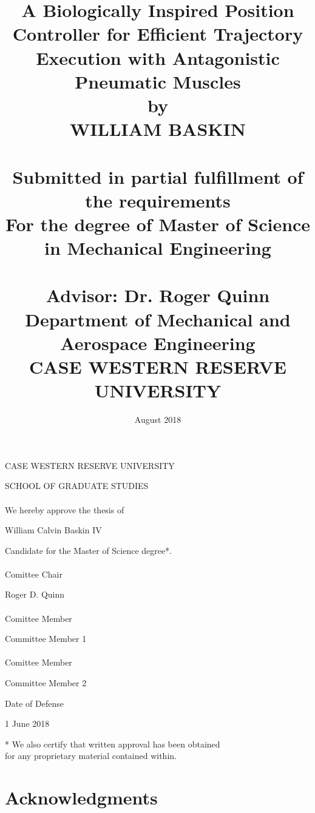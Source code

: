 \documentclass[12pt, letterpaper, oneside, onecolumn]{report} %
\title{
  {A Biologically Inspired Position Controller for Efficient Trajectory Execution with Antagonistic Pneumatic Muscles}\\
  {\large by \\
  WILLIAM BASKIN \\~\\
  Submitted in partial fulfillment of the requirements\\
  For the degree of Master of Science in Mechanical Engineering\\~\\
  Advisor: Dr. Roger Quinn\\
  Department of Mechanical and Aerospace Engineering\\
  CASE WESTERN RESERVE UNIVERSITY}\\
}
\date{August 2018}
\begin{document}
\maketitle

\clearpage
\thispagestyle{empty}

\begin{center}
CASE WESTERN RESERVE UNIVERSITY

SCHOOL OF GRADUATE STUDIES \\~\\

\hspace{-\parindent}We hereby approve the thesis of

William Calvin Baskin IV

\hspace{-\parindent}Candidate for the Master of Science degree*.\\~\\

Comittee Chair

Roger D. Quinn\\~\\


Comittee Member

Committee Member 1\\~\\

Comittee Member

Committee Member 2

\vfill

Date of Defense

1 June 2018

* We also certify that written approval has been obtained\\for any proprietary material contained within.
\end{center}

\clearpage
\setcounter{page}{1}

\tableofcontents

\listoffigures

\chapter*{Acknowledgments}
\label{chap:acknowledgements}
\end{document}

